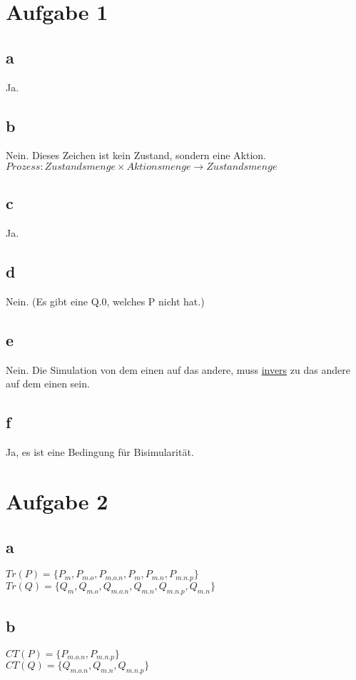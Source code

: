 \documentclass[]{article}
\title{}
\author{}
\begin{document}
\maketitle



\section{Aufgabe 1}
\subsection{a}
Ja.
\subsection{b}
Nein. Dieses Zeichen ist kein Zustand, sondern eine Aktion.\\ $Prozess: Zustandsmenge \times Aktionsmenge \to Zustandsmenge  $
\subsection{c}
Ja.
\subsection{d}
Nein. (Es gibt eine Q.0, welches P nicht hat.)
\subsection{e}
Nein. Die Simulation von dem einen auf das andere, muss \underline{invers} zu das andere auf dem einen sein.
\subsection{f}
Ja, es ist eine Bedingung für Bisimularität.

\section{Aufgabe 2 }
\subsection{a}
$Tr(P) = \{P_m, P_{m.o},P_{m.o.n}, P_m, P _ {m.n}, P_{m.n.p} \}$ \\
$Tr(Q)= \{Q_{m}, Q_{m.o},Q_{m.o.n},Q_{m.n},Q_{m.n.p},Q_{m.n}                                                                                                                                          \}  $
\subsection{b}
$CT(P)= \{            P_{m.o.n},      P_{m.n.p}                                                                                    \}    $\\
$CT(Q)= \{                Q_{m.o.n},Q_{m.n},Q_{m.n.p}                                                                                              \}$
\end{document}
